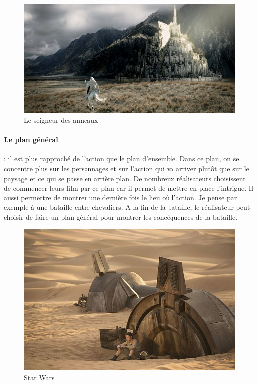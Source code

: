 \documentclass{article}
\begin{document}
\begin{figure}[h]
\centering
\includegraphics[scale=0.2]{img/plan1.png}
\caption{Le seigneur des anneaux}
\label{fig:regle_tiers}
\end{figure}

	\paragraph{Le plan général}: il est plus rapproché de l'action que le plan d'ensemble. Dans ce plan, on se concentre plus sur les personnages et sur l'action qui va arriver plutôt que sur le paysage et ce qui se passe en arrière plan. De nombreux réalisateurs choisissent de commencer leurs film par ce plan car il permet de mettre en place l'intrigue. Il aussi permettre de montrer une dernière fois le lieu où l'action. Je pense par exemple à une bataille entre chevaliers. A la fin de la bataille, le réalisateur peut choisir de faire un plan général pour montrer les concéquences de la bataille. 

\begin{figure}[h]
\centering
\includegraphics[scale=0.25]{img/plan2.jpg}
\caption{Star Wars}
\label{fig:regle_tiers}
\end{figure}
\end{document}
